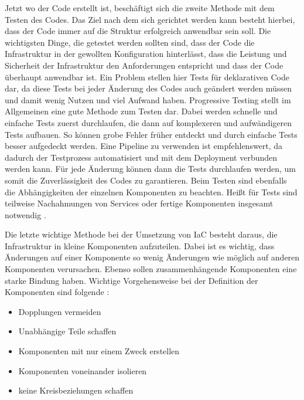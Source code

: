 \documentclass[biblatex]{lni}
\begin{document}
Jetzt wo der Code erstellt ist, beschäftigt sich die zweite Methode mit dem Testen des Codes. Das Ziel nach dem sich gerichtet werden kann besteht hierbei, dass der Code immer auf die Struktur erfolgreich anwendbar sein soll. Die wichtigsten Dinge, die getestet werden sollten sind, dass der Code die Infrastruktur in der gewollten Konfiguration hinterlässt, dass die Leistung und Sicherheit der Infrastruktur den Anforderungen entspricht und dass der Code überhaupt anwendbar ist. Ein Problem stellen hier Tests für deklarativen Code dar, da diese Tests bei jeder Änderung des Codes auch geändert werden müssen und damit wenig Nutzen und viel Aufwand haben. Progressive Testing stellt im Allgemeinen eine gute Methode zum Testen dar. Dabei werden schnelle und einfache Tests zuerst durchlaufen, die dann auf komplexeren und aufwändigeren Tests aufbauen. So können grobe Fehler früher entdeckt und durch einfache Tests besser aufgedeckt werden. Eine Pipeline zu verwenden ist empfehlenswert, da dadurch der Testprozess automatisiert und mit dem Deployment verbunden werden kann. Für jede Änderung können dann die Tests durchlaufen werden, um somit die Zuverlässigkeit des Codes zu garantieren. Beim Testen sind ebenfalls die Abhängigkeiten der einzelnen Komponenten zu beachten. Heißt für Tests sind teilweise Nachahmungen von Services oder fertige Komponenten insgesamt notwendig \cite{Morris.December2020}.

Die letzte wichtige Methode bei der Umsetzung von IaC besteht daraus, die Infrastruktur in kleine Komponenten aufzuteilen. Dabei ist es wichtig, dass Änderungen auf einer Komponente so wenig Änderungen wie möglich auf anderen Komponenten verursachen. Ebenso sollen zusammenhängende Komponenten eine starke Bindung haben. Wichtige Vorgehensweise bei der Definition der Komponenten sind folgende \cite{Morris.December2020}:
\begin{itemize}
    \item Dopplungen vermeiden
    \item Unabhängige Teile schaffen
    \item Komponenten mit nur einem Zweck erstellen
    \item Komponenten voneinander isolieren
    \item keine Kreisbeziehungen schaffen
\end{itemize}
\end{document}
